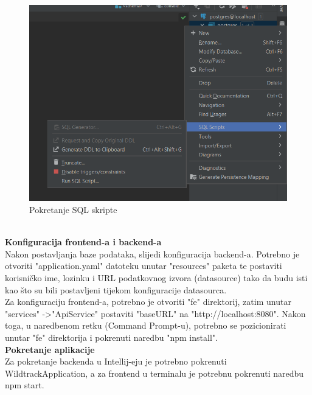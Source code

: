 			\begin{figure}[H]
				\includegraphics[scale=0.3]{slike/runSqlScript.png} 
				\centering
				\caption{Pokretanje SQL skripte}
				\label{fig:promjene}
			\end{figure}
			\\
			\textbf{Konfiguracija frontend-a i backend-a}
			\\
			Nakon postavljanja baze podataka, slijedi konfiguracija backend-a. Potrebno je otvoriti "application.yaml" datoteku unutar "resources" paketa te postaviti korisničko ime, lozinku i URL podatkovnog izvora (datasource) tako da budu isti kao što su bili postavljeni tijekom konfiguracije datasourca.
			\\
			Za konfiguraciju frontend-a, potrebno je otvoriti "fe" direktorij, zatim unutar "services" -\textgreater "ApiService" postaviti "baseURL" na "http://localhost:8080". Nakon toga, u naredbenom retku (Command Prompt-u), potrebno se pozicionirati unutar "fe" direktorija i pokrenuti naredbu "npm install".
			\\
			\textbf{Pokretanje aplikacije}
			\\
			Za pokretanje backenda u Intellij-eju je potrebno pokrenuti WildtrackApplication, a za frontend u terminalu je potrebnu pokrenuti naredbu npm start.
			
			\eject 